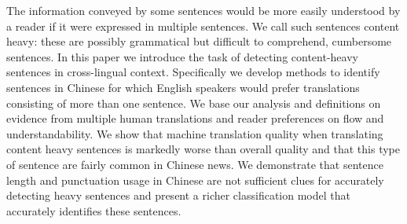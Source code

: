 The information conveyed by some sentences would be more easily understood by a reader if it were expressed in multiple sentences. We call such sentences content heavy: these are possibly grammatical but difficult to comprehend, cumbersome sentences. In this paper we introduce the task of detecting content-heavy sentences in cross-lingual context. Specifically we develop methods to identify sentences in Chinese for which English speakers would prefer translations consisting of more than one sentence.  We base our analysis and definitions on evidence from multiple human translations and reader preferences on flow and understandability. We show that machine translation quality when translating content heavy sentences is markedly worse than overall quality and that this type of sentence are fairly common in Chinese news. We demonstrate that sentence length and  punctuation usage in Chinese are not sufficient clues for accurately detecting heavy sentences and present a richer classification model that accurately identifies these sentences.

